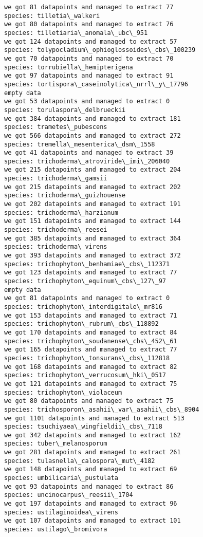 \documentclass[11pt]{article}
\begin{document}
\begin{Verbatim}[commandchars=\\\{\}]
we got 81 datapoints and managed to extract 77
species: tilletia\_walkeri
we got 80 datapoints and managed to extract 76
species: tilletiaria\_anomala\_ubc\_951
we got 124 datapoints and managed to extract 57
species: tolypocladium\_ophioglossoides\_cbs\_100239
we got 70 datapoints and managed to extract 70
species: torrubiella\_hemipterigena
we got 97 datapoints and managed to extract 91
species: tortispora\_caseinolytica\_nrrl\_y\_17796
empty data
we got 53 datapoints and managed to extract 0
species: torulaspora\_delbrueckii
we got 384 datapoints and managed to extract 181
species: trametes\_pubescens
we got 566 datapoints and managed to extract 272
species: tremella\_mesenterica\_dsm\_1558
we got 41 datapoints and managed to extract 39
species: trichoderma\_atroviride\_imi\_206040
we got 215 datapoints and managed to extract 204
species: trichoderma\_gamsii
we got 215 datapoints and managed to extract 202
species: trichoderma\_guizhouense
we got 202 datapoints and managed to extract 191
species: trichoderma\_harzianum
we got 151 datapoints and managed to extract 144
species: trichoderma\_reesei
we got 385 datapoints and managed to extract 364
species: trichoderma\_virens
we got 393 datapoints and managed to extract 372
species: trichophyton\_benhamiae\_cbs\_112371
we got 123 datapoints and managed to extract 77
species: trichophyton\_equinum\_cbs\_127\_97
empty data
we got 81 datapoints and managed to extract 0
species: trichophyton\_interdigitale\_mr816
we got 153 datapoints and managed to extract 71
species: trichophyton\_rubrum\_cbs\_118892
we got 170 datapoints and managed to extract 84
species: trichophyton\_soudanense\_cbs\_452\_61
we got 165 datapoints and managed to extract 77
species: trichophyton\_tonsurans\_cbs\_112818
we got 168 datapoints and managed to extract 82
species: trichophyton\_verrucosum\_hki\_0517
we got 121 datapoints and managed to extract 75
species: trichophyton\_violaceum
we got 80 datapoints and managed to extract 75
species: trichosporon\_asahii\_var\_asahii\_cbs\_8904
we got 1101 datapoints and managed to extract 513
species: tsuchiyaea\_wingfieldii\_cbs\_7118
we got 342 datapoints and managed to extract 162
species: tuber\_melanosporum
we got 281 datapoints and managed to extract 261
species: tulasnella\_calospora\_mut\_4182
we got 148 datapoints and managed to extract 69
species: umbilicaria\_pustulata
we got 93 datapoints and managed to extract 86
species: uncinocarpus\_reesii\_1704
we got 197 datapoints and managed to extract 96
species: ustilaginoidea\_virens
we got 107 datapoints and managed to extract 101
species: ustilago\_bromivora

\end{Verbatim}
\end{document}
